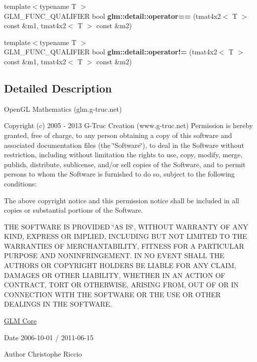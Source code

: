 \begin{DoxyCompactItemize}
\item 
\hypertarget{namespaceglm_1_1detail_a5b244ed973691f786c1669f993544002}{}{\footnotesize template$<$typename T $>$ }\\G\+L\+M\+\_\+\+F\+U\+N\+C\+\_\+\+Q\+U\+A\+L\+I\+F\+I\+E\+R bool {\bfseries glm\+::detail\+::operator==} (tmat4x2$<$ T $>$ const \&m1, tmat4x2$<$ T $>$ const \&m2)\label{namespaceglm_1_1detail_a5b244ed973691f786c1669f993544002}

\item 
\hypertarget{namespaceglm_1_1detail_a10d1b000b2e24547882c48dc1d479eed}{}{\footnotesize template$<$typename T $>$ }\\G\+L\+M\+\_\+\+F\+U\+N\+C\+\_\+\+Q\+U\+A\+L\+I\+F\+I\+E\+R bool {\bfseries glm\+::detail\+::operator!=} (tmat4x2$<$ T $>$ const \&m1, tmat4x2$<$ T $>$ const \&m2)\label{namespaceglm_1_1detail_a10d1b000b2e24547882c48dc1d479eed}

\end{DoxyCompactItemize}


\subsection{Detailed Description}
Open\+G\+L Mathematics (glm.\+g-\/truc.\+net)

Copyright (c) 2005 -\/ 2013 G-\/\+Truc Creation (www.\+g-\/truc.\+net) Permission is hereby granted, free of charge, to any person obtaining a copy of this software and associated documentation files (the \char`\"{}\+Software\char`\"{}), to deal in the Software without restriction, including without limitation the rights to use, copy, modify, merge, publish, distribute, sublicense, and/or sell copies of the Software, and to permit persons to whom the Software is furnished to do so, subject to the following conditions\+:

The above copyright notice and this permission notice shall be included in all copies or substantial portions of the Software.

T\+H\+E S\+O\+F\+T\+W\+A\+R\+E I\+S P\+R\+O\+V\+I\+D\+E\+D \char`\"{}\+A\+S I\+S\char`\"{}, W\+I\+T\+H\+O\+U\+T W\+A\+R\+R\+A\+N\+T\+Y O\+F A\+N\+Y K\+I\+N\+D, E\+X\+P\+R\+E\+S\+S O\+R I\+M\+P\+L\+I\+E\+D, I\+N\+C\+L\+U\+D\+I\+N\+G B\+U\+T N\+O\+T L\+I\+M\+I\+T\+E\+D T\+O T\+H\+E W\+A\+R\+R\+A\+N\+T\+I\+E\+S O\+F M\+E\+R\+C\+H\+A\+N\+T\+A\+B\+I\+L\+I\+T\+Y, F\+I\+T\+N\+E\+S\+S F\+O\+R A P\+A\+R\+T\+I\+C\+U\+L\+A\+R P\+U\+R\+P\+O\+S\+E A\+N\+D N\+O\+N\+I\+N\+F\+R\+I\+N\+G\+E\+M\+E\+N\+T. I\+N N\+O E\+V\+E\+N\+T S\+H\+A\+L\+L T\+H\+E A\+U\+T\+H\+O\+R\+S O\+R C\+O\+P\+Y\+R\+I\+G\+H\+T H\+O\+L\+D\+E\+R\+S B\+E L\+I\+A\+B\+L\+E F\+O\+R A\+N\+Y C\+L\+A\+I\+M, D\+A\+M\+A\+G\+E\+S O\+R O\+T\+H\+E\+R L\+I\+A\+B\+I\+L\+I\+T\+Y, W\+H\+E\+T\+H\+E\+R I\+N A\+N A\+C\+T\+I\+O\+N O\+F C\+O\+N\+T\+R\+A\+C\+T, T\+O\+R\+T O\+R O\+T\+H\+E\+R\+W\+I\+S\+E, A\+R\+I\+S\+I\+N\+G F\+R\+O\+M, O\+U\+T O\+F O\+R I\+N C\+O\+N\+N\+E\+C\+T\+I\+O\+N W\+I\+T\+H T\+H\+E S\+O\+F\+T\+W\+A\+R\+E O\+R T\+H\+E U\+S\+E O\+R O\+T\+H\+E\+R D\+E\+A\+L\+I\+N\+G\+S I\+N T\+H\+E S\+O\+F\+T\+W\+A\+R\+E.

\hyperlink{group__core}{G\+L\+M Core}

\begin{DoxyDate}{Date}
2006-\/10-\/01 / 2011-\/06-\/15 
\end{DoxyDate}
\begin{DoxyAuthor}{Author}
Christophe Riccio 
\end{DoxyAuthor}
